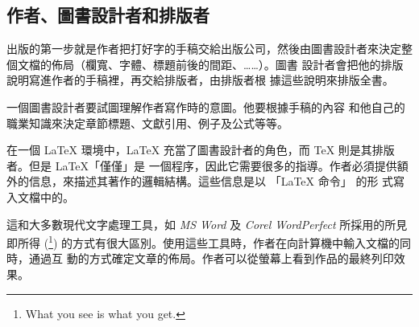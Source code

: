 \subsection{作者、圖書設計者和排版者}

出版的第一步就是作者把打好字的手稿交給出版公司，然後由圖書設計者來決定整個文檔的佈局（欄寬、字體、標題前後的間距、……）。圖書
設計者會把他的排版說明寫進作者的手稿裡，再交給排版者，由排版者根
據這些說明來排版全書。


一個圖書設計者要試圖理解作者寫作時的意圖。他要根據手稿的內容
和他自己的職業知識來決定章節標題、文獻引用、例子及公式等等。


在一個 \LaTeX{} 環境中，\LaTeX{} 充當了圖書設計者的角色，而 \TeX{} 則是其排版者。但是 \LaTeX 「僅僅」是
一個程序，因此它需要很多的指導。作者必須提供額外的信息，來描述其著作的邏輯結構。這些信息是以 「\LaTeX{} 命令」 的形
式寫入文檔中的。

這和大多數現代文字處理工具，如 \emph{MS Word} 及 \emph{Corel
WordPerfect} 所採用的所見即所得 (\footnote{What you see
is what you
get.}) 的方式有很大區別。使用這些工具時，作者在向計算機中輸入文檔的同時，通過互
動的方式確定文章的佈局。作者可以從螢幕上看到作品的最終列印效果。

